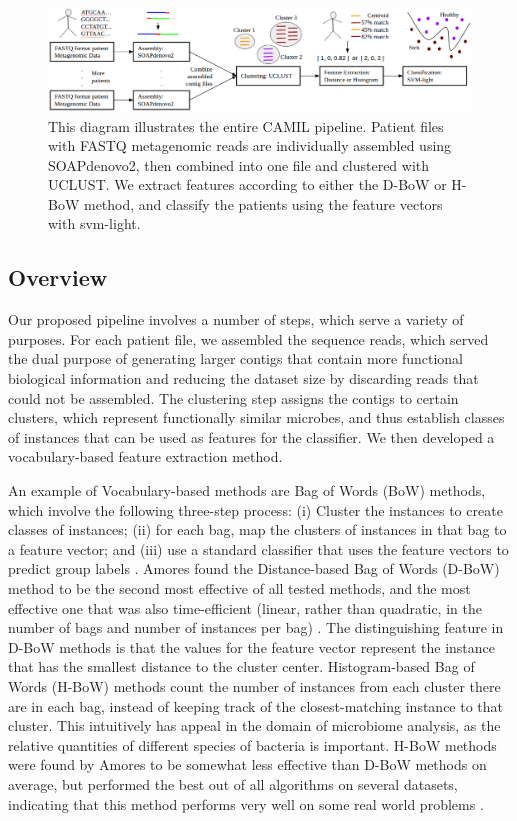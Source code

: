 
\begin{figure}[t]
\centering
\includegraphics[scale=0.5]{./mil-metagenomics-pipeline.png}
\caption{This diagram illustrates the entire CAMIL pipeline. Patient files with FASTQ metagenomic reads are individually assembled using SOAPdenovo2, then combined into one file and clustered with UCLUST. We extract features according to either the D-BoW or H-BoW method, and classify the patients using the feature vectors with svm-light.} \label{pipeline}
\end{figure}

\subsection{Overview}

Our proposed pipeline involves a number of steps, which serve a variety of purposes. For each patient file, we assembled the sequence reads, which served the dual purpose of generating larger contigs that contain more functional biological information and reducing the dataset size by discarding reads that could not be assembled. The clustering step assigns the contigs to certain clusters, which represent functionally similar microbes, and thus establish classes of instances that can be used as features for the classifier. We then developed a vocabulary-based feature extraction method.

An example of Vocabulary-based methods are Bag of Words (BoW) methods, which involve the following three-step process: (i) Cluster the instances to create classes of instances; (ii) for each bag, map the clusters of instances in that bag to a feature vector; and (iii) use a standard classifier that uses the feature vectors to predict group labels \cite{amores13}. Amores found the Distance-based Bag of Words (D-BoW) method to be the second most effective of all tested methods, and the most effective one that was also time-efficient (linear, rather than quadratic, in the number of bags and number of instances per bag) \cite{amores13}. The distinguishing feature in D-BoW methods is that the values for the feature vector represent the instance that has the smallest distance to the cluster center. Histogram-based Bag of Words (H-BoW) methods count the number of instances from each cluster there are in each bag, instead of keeping track of the closest-matching instance to that cluster. This intuitively has appeal in the domain of microbiome analysis, as the relative quantities of different species of bacteria is important. H-BoW methods were found by Amores to be somewhat less effective than D-BoW methods on average, but performed the best out of all algorithms on several datasets, indicating that this method performs very well on some real world problems \cite{amores13}.

